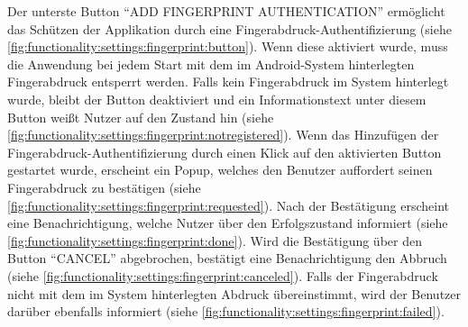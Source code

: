 \documentclass[a4paper]{article}
\begin{document}
Der unterste Button "`ADD FINGERPRINT AUTHENTICATION"' ermöglicht das Schützen der Applikation durch eine Fingerabdruck-Authentifizierung (siehe \autoref{fig:functionality:settings:fingerprint:button}). Wenn diese aktiviert wurde, muss die Anwendung bei jedem Start mit dem im Android-System hinterlegten Fingerabdruck entsperrt werden. Falls kein Fingerabdruck im System hinterlegt wurde, bleibt der Button deaktiviert und ein Informationstext unter diesem Button weißt Nutzer auf den Zustand hin (siehe \autoref{fig:functionality:settings:fingerprint:notregistered}). Wenn das Hinzufügen der Fingerabdruck-Authentifizierung durch einen Klick auf den aktivierten Button gestartet wurde, erscheint ein Popup, welches den Benutzer auffordert seinen Fingerabdruck zu bestätigen (siehe \autoref{fig:functionality:settings:fingerprint:requested}). Nach der Bestätigung erscheint eine Benachrichtigung, welche Nutzer über den Erfolgszustand informiert (siehe \autoref{fig:functionality:settings:fingerprint:done}). Wird die Bestätigung über den Button "`CANCEL"' abgebrochen, bestätigt eine Benachrichtigung den Abbruch (siehe \autoref{fig:functionality:settings:fingerprint:canceled}). Falls der Fingerabdruck nicht mit dem im System hinterlegten Abdruck übereinstimmt, wird der Benutzer darüber ebenfalls informiert (siehe \autoref{fig:functionality:settings:fingerprint:failed}).
\end{document}
